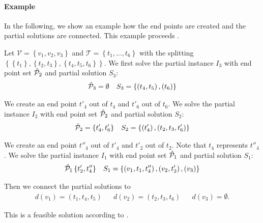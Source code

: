\paragraph{Example} \parfill

In the following, we show an example how the end points are created and the partial solutions are connected. This example proceeds .

\begin{example}

Let ${\mathcal{V}=\left\{v_1,v_2,v_3\right\}}$ and ${\mathcal{T}=\left\{t_1,\dots,t_6\right\}}$ with the splitting $\left\{\left\{t_1\right\},\left\{t_2,t_3\right\},\left\{t_4,t_5,t_6\right\}\right\}$. We first solve the partial instance $I_3$ with end point set $\hat{\mathcal{P}}_2$ and partial solution $S_3$:
\begin{align*}
	\hat{\mathcal{P}}_3 = \emptyset && S_3 = \left\{\left(t_4, t_5\right), \left(t_6\right)\right\}
\end{align*}

We create an end point $t'_4$ out of $t_4$ and $t'_6$ out of $t_6$. We solve the partial instance $I_2$ with end point set $\hat{\mathcal{P}}_2$ and partial solution $S_2$:
\begin{align*}
	\hat{\mathcal{P}}_2 = \left\{t'_4,t'_6\right\} && S_2 = \left\{\left(t'_4\right), \left(t_2,t_3,t'_6\right)\right\}
\end{align*}

We create an end point $t''_4$ out of $t'_4$ and $t'_2$ out of $t_2$. Note that $t_4$ represents $t''_4$. We solve the partial instance $I_1$ with end point set $\hat{\mathcal{P}}_1$ and partial solution $S_1$:
\begin{align*}
	\hat{\mathcal{P}}_1\left\{t'_2,t''_4\right\} && S_1 = \left\{\left(v_1,t_1,t''_4\right), \left(v_2,t'_2\right), \left(v_3\right)\right\}
\end{align*}

Then we connect the partial solutions to 
\begin{align*}
	d\left(v_1\right) = \left(t_1,t_4,t_5\right) && d\left(v_2\right) = \left(t_2,t_3,t_6\right) && d\left(v_3\right) = \emptyset.
\end{align*}

This is a feasible solution according to .

\end{example}


